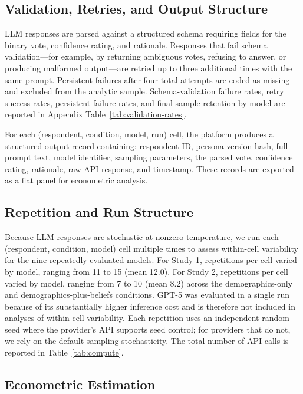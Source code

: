 \documentclass[12pt]{article}
\begin{document}
\subsection{Validation, Retries, and Output Structure}\label{sec:methods-validation}

LLM responses are parsed against a structured schema requiring fields for
the binary vote, confidence rating, and rationale. Responses that fail
schema validation---for example, by returning ambiguous votes, refusing
to answer, or producing malformed output---are retried up to three
additional times with the same prompt. Persistent failures after four
total attempts are coded as missing and excluded from the analytic sample.
Schema-validation failure rates, retry success rates, persistent failure
rates, and final sample retention by model are reported in Appendix
Table~\ref{tab:validation-rates}.

For each (respondent, condition, model, run) cell, the platform produces
a structured output record containing: respondent ID, persona version
hash, full prompt text, model identifier, sampling parameters, the parsed
vote, confidence rating, rationale, raw API response, and timestamp.
These records are exported as a flat panel for econometric analysis.

\subsection{Repetition and Run Structure}\label{sec:methods-repetition}

Because LLM responses are stochastic at nonzero temperature, we run each
(respondent, condition, model) cell multiple times to assess within-cell
variability for the nine repeatedly evaluated models. For Study 1,
repetitions per cell varied by model, ranging from 11 to 15
(mean 12.0). For Study 2, repetitions per cell varied by model, ranging
from 7 to 10 (mean 8.2) across the demographics-only and
demographics-plus-beliefs conditions. GPT-5 was evaluated in a single
run because of its substantially higher inference cost and is therefore
not included in analyses of within-cell variability. Each repetition
uses an independent random seed where the provider's API supports seed
control; for providers that do not, we rely on the default sampling
stochasticity. The total number of API calls is reported in
Table~\ref{tab:compute}.

\label{tab:compute}

\subsection{Econometric Estimation}\label{sec:methods-econ}
\end{document}
